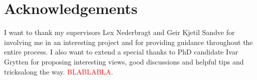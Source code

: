 \documentclass[thesis.tex]{subfiles}
\begin{document}
\chapter*{Acknowledgements}
I want to thank my supervisors Lex Nederbragt and Geir Kjetil Sandve for involving me in an interesting project and for providing guidance throughout the entire process. I also want to extend a special thanks to PhD candidate Ivar Grytten for proposing interesting views, good discussions and helpful tips and tricksalong the way. \textcolor{red}{BLABLABLA}.
\end{document}
